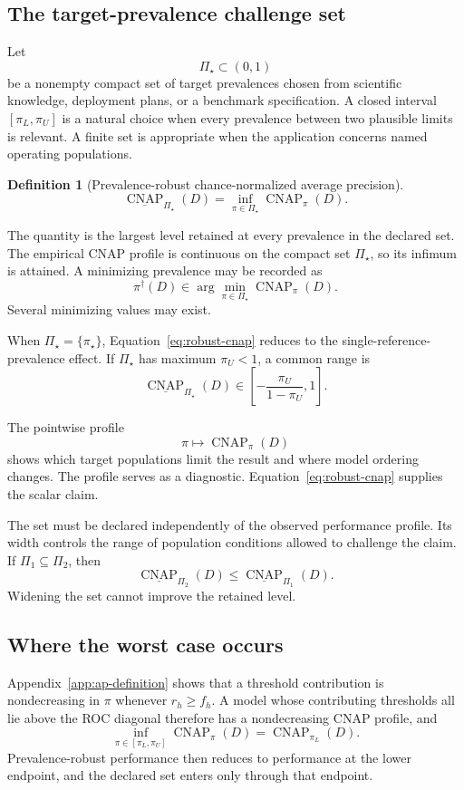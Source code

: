 \documentclass[11pt]{article}
\newcommand{\CNAP}{\operatorname{CNAP}}
\newcommand{\PSet}{\Pi_\star}
\newcommand{\RobCNAP}{\underline{\CNAP}_{\PSet}}
\newtheorem{definition}{Definition}
\theoremstyle{remark}
\begin{document}
\subsection{The target-prevalence challenge set}

Let
\[
\PSet\subset(0,1)
\]
be a nonempty compact set of target prevalences chosen from scientific knowledge, deployment plans, or a benchmark specification. A closed interval $[\pi_L,\pi_U]$ is a natural choice when every prevalence between two plausible limits is relevant. A finite set is appropriate when the application concerns named operating populations.

\begin{definition}[Prevalence-robust chance-normalized average precision]
\begin{equation}
\RobCNAP(D)
=
\inf_{\pi\in\PSet}\CNAP_\pi(D).
\label{eq:robust-cnap}
\end{equation}
\end{definition}

The quantity is the largest level retained at every prevalence in the declared set. The empirical CNAP profile is continuous on the compact set $\PSet$, so its infimum is attained. A minimizing prevalence may be recorded as
\[
\pi^\dagger(D)
\in
\arg\min_{\pi\in\PSet}\CNAP_\pi(D).
\]
Several minimizing values may exist.

When $\PSet=\{\pi_\star\}$, Equation~\eqref{eq:robust-cnap} reduces to the single-reference-prevalence effect. If $\PSet$ has maximum $\pi_U<1$, a common range is
\[
\RobCNAP(D)
\in
\left[-\frac{\pi_U}{1-\pi_U},1\right].
\]

The pointwise profile
\[
\pi\longmapsto\CNAP_\pi(D)
\]
shows which target populations limit the result and where model ordering changes. The profile serves as a diagnostic. Equation~\eqref{eq:robust-cnap} supplies the scalar claim.

The set must be declared independently of the observed performance profile. Its width controls the range of population conditions allowed to challenge the claim. If $\Pi_1\subseteq\Pi_2$, then
\[
\underline{\CNAP}_{\Pi_2}(D)
\leq
\underline{\CNAP}_{\Pi_1}(D).
\]
Widening the set cannot improve the retained level.

\subsection{Where the worst case occurs}
\label{sec:worst-case}

Appendix~\ref{app:ap-definition} shows that a threshold contribution is nondecreasing in $\pi$ whenever $r_h\geq f_h$. A model whose contributing thresholds all lie above the ROC diagonal therefore has a nondecreasing CNAP profile, and
\[
\inf_{\pi\in[\pi_L,\pi_U]}\CNAP_\pi(D)
=
\CNAP_{\pi_L}(D).
\]
Prevalence-robust performance then reduces to performance at the lower endpoint, and the declared set enters only through that endpoint.
\end{document}
